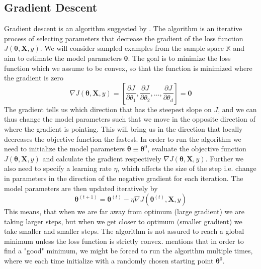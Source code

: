 \subsection{Gradient Descent} 
Gradient descent is an algorithm suggested by \cite{Cauchy1847}. The algorithm is an iterative process of selecting parameters that decrease the gradient of the loss function $J(\boldsymbol{\theta},\boldsymbol{X},y)$. We will consider sampled examples from the sample space $\mathbb{X}$ and aim to estimate the model parameters $\boldsymbol{\theta}$. The goal is to minimize the loss function which we assume to be convex, so that the function is minimized where the gradient is zero
\begin{equation*}
    \nabla J(\boldsymbol{\theta},\boldsymbol{X},y)=\left[\frac{\partial J}{\partial\theta_1},\frac{\partial J}{\partial\theta_2},\ldots,\frac{\partial J}{\partial\theta_d}\right]=\boldsymbol{0}
\end{equation*}
The gradient tells us which direction that has the steepest slope on $J$, and we can thus change the model parameters such that we move in the opposite direction of where the gradient is pointing. This will bring us in the direction that locally decreases the objective function the fastest. In order to run the algorithm we need to initialize the model parameters $\boldsymbol{\theta}\equiv\boldsymbol{\theta}^0$, evaluate the objective function $J(\boldsymbol{\theta},\boldsymbol{X},y)$ and calculate the gradient respectively $\nabla J(\boldsymbol{\theta},\boldsymbol{X},y)$. Further we also need to specify a learning rate $\eta$, which affects the size of the step i.e. change in parameters in the direction of the negative gradient for each iteration. The model parameters are then updated iteratively by
\begin{equation*}
    \boldsymbol{\theta}^{(t+1)}=\boldsymbol{\theta}^{(t)}-\eta \nabla J(\boldsymbol{\theta}^{(t)},\boldsymbol{X},y)
\end{equation*}
This means, that when we are far away from optimum (large gradient) we are taking larger steps, but when we get closer to optimum (smaller gradient) we take smaller and smaller steps. The algorithm is not assured to reach a global minimum unless the loss function is strictly convex. \cite{bishop2007} mentions that in order to find a "good" minimum, we might be forced to run the algorithm multiple times, where we each time initialize with a randomly chosen starting point $\boldsymbol{\theta}^0$. 

